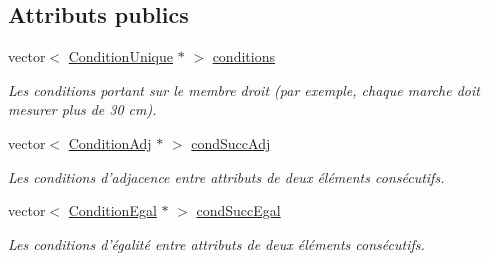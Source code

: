 \subsection*{Attributs publics}
\begin{DoxyCompactItemize}
\item 
vector$<$ \hyperlink{class_condition_unique}{Condition\-Unique} $\ast$ $>$ \hyperlink{class_regle_sequence_a7e254237c15832f3b5e79fef57fdac54}{conditions}
\begin{DoxyCompactList}\small\item\em Les conditions portant sur le membre droit (par exemple, chaque marche doit mesurer plus de 30 cm). \end{DoxyCompactList}\item 
vector$<$ \hyperlink{class_condition_adj}{Condition\-Adj} $\ast$ $>$ \hyperlink{class_regle_sequence_a0b99e9875a308dac54e99358d5d2a712}{cond\-Succ\-Adj}
\begin{DoxyCompactList}\small\item\em Les conditions d'adjacence entre attributs de deux éléments consécutifs. \end{DoxyCompactList}\item 
vector$<$ \hyperlink{class_condition_egal}{Condition\-Egal} $\ast$ $>$ \hyperlink{class_regle_sequence_aeb7ff397207904508a29b2f15c6841f1}{cond\-Succ\-Egal}
\begin{DoxyCompactList}\small\item\em Les conditions d'égalité entre attributs de deux éléments consécutifs. \end{DoxyCompactList}\end{DoxyCompactItemize}
